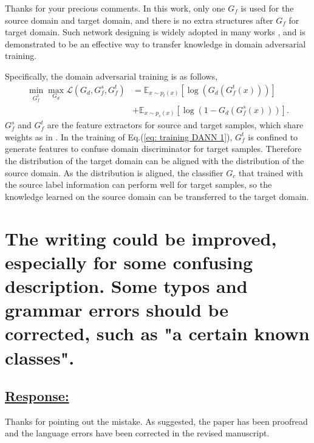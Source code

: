 Thanks for your precious comments.
In this work, only one $G_f$ is used for the source domain and target domain, and there is no extra structures after $G_f$ for target domain.
Such network designing is widely adopted in many works \cite{OpensetDA-bp,PartialDA-tf,UniversalDomainAdaptation}, and is demonstrated to be an effective way to transfer knowledge in domain adversarial training.

Specifically, the domain adversarial training is as follows,
\begin{equation}
    \label{eq: training DANN 1}
    \begin{split}
        \min_{G_f^t} \max_{G_d} \mathscr{L}(G_d,G^{s}_{f},G_f^t) &=\mathbb{E}_{x\sim p_t(x)} \left[ \log \left(G_d\left(G_f^t\left(x\right)\right)\right) \right]\\
        &+\mathbb{E}_{x\sim p_s(x)}\left[ \log \left(1-G_d\left(G_f^s\left(x\right)\right)\right) \right].
    \end{split}
\end{equation}
$G_f^s$ and $G_f^t$ are the feature extractors for source and target samples, which share weights as in \cite{OpensetDA-bp}.
In the training of Eq.(\ref{eq: training DANN 1}), $G_f^t$ is confined to generate features to confuse domain discriminator for target samples.
Therefore the distribution of the target domain can be aligned with the distribution of the source domain.
As the distribution is aligned, the classifier $G_c$ that trained with the source label information can perform well for target samples, so the knowledge learned on the source domain can be transferred to the target domain.


\section{The writing could be improved, especially for some confusing description.
Some typos and grammar errors should be corrected, such as "a certain known classes".}

\subsection*{\underline{\textbf{Response:}}}

Thanks for pointing out the mistake.
As suggested, the paper has been proofread and the language errors have been corrected in the revised manuscript.

